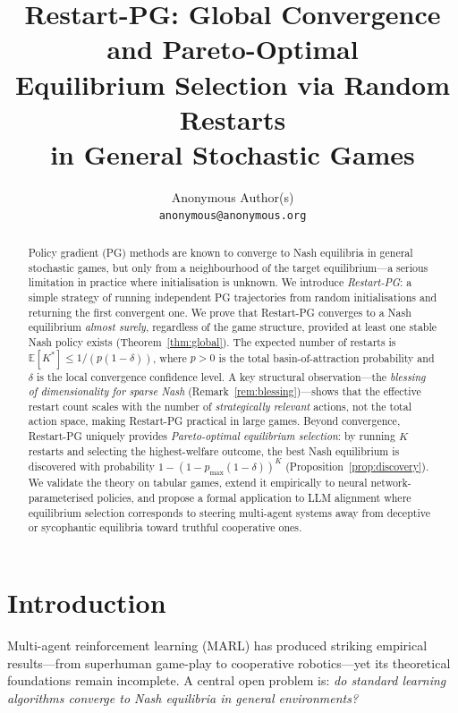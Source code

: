 \documentclass{article}
\title{Restart-PG: Global Convergence and Pareto-Optimal\\
  Equilibrium Selection via Random Restarts\\
  in General Stochastic Games}
\author{
  Anonymous Author(s)\\
  \texttt{anonymous@anonymous.org}
}
\newcommand{\E}{\mathbb{E}}
\begin{document}
\maketitle

\begin{abstract}
Policy gradient (PG) methods are known to converge to Nash equilibria
in general stochastic games, but only from a neighbourhood of the
target equilibrium---a serious limitation in practice where
initialisation is unknown. We introduce \emph{Restart-PG}: a simple
strategy of running independent PG trajectories from random
initialisations and returning the first convergent one. We prove
that Restart-PG converges to a Nash equilibrium \emph{almost surely},
regardless of the game structure, provided at least one stable Nash
policy exists (Theorem~\ref{thm:global}). The expected number of
restarts is $\E[K^*] \le 1 / (p(1-\delta))$, where $p > 0$ is the
total basin-of-attraction probability and $\delta$ is the local
convergence confidence level. A key structural observation---the
\emph{blessing of dimensionality for sparse Nash} (Remark~\ref{rem:blessing})---shows
that the effective restart count scales with the number of
\emph{strategically relevant} actions, not the total action space,
making Restart-PG practical in large games. Beyond convergence,
Restart-PG uniquely provides \emph{Pareto-optimal equilibrium
selection}: by running $K$ restarts and selecting the highest-welfare
outcome, the best Nash equilibrium is discovered with probability
$1 - (1 - p_{\max}(1-\delta))^K$ (Proposition~\ref{prop:discovery}).
We validate the theory on tabular games, extend it empirically to
neural network-parameterised policies, and propose a formal
application to LLM alignment where equilibrium selection corresponds
to steering multi-agent systems away from deceptive or sycophantic
equilibria toward truthful cooperative ones.
\end{abstract}

\section{Introduction}
\label{sec:intro}

Multi-agent reinforcement learning (MARL) has produced striking
empirical results---from superhuman game-play to cooperative
robotics---yet its theoretical foundations remain incomplete. A
central open problem is: \emph{do standard learning algorithms converge
to Nash equilibria in general environments?}
\end{document}
